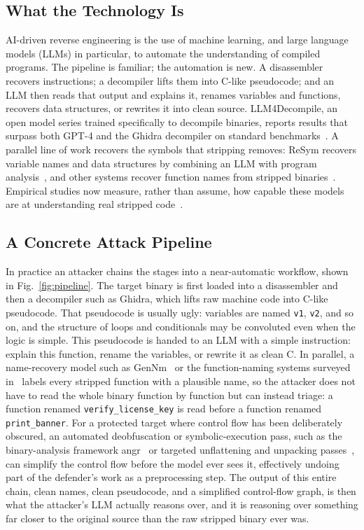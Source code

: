 \documentclass[conference]{IEEEtran}
\begin{document}
\subsection{What the Technology Is}
AI-driven reverse engineering is the use of machine learning, and large language
models (LLMs) in particular, to automate the understanding of compiled programs.
The pipeline is familiar; the automation is new. A disassembler recovers
instructions; a decompiler lifts them into C-like pseudocode; and an LLM then reads
that output and explains it, renames variables and functions, recovers data
structures, or rewrites it into clean source. LLM4Decompile, an open model series
trained specifically to decompile binaries, reports results that surpass both GPT-4
and the Ghidra decompiler on standard benchmarks~\cite{llm4decompile}. A parallel
line of work recovers the symbols that stripping removes: ReSym recovers variable
names and data structures by combining an LLM with program analysis~\cite{resym},
and other systems recover function names from stripped
binaries~\cite{gennm,funcname}. Empirical studies now measure, rather than assume,
how capable these models are at understanding real stripped
code~\cite{howfar,empirical}.

\subsection{A Concrete Attack Pipeline}
In practice an attacker chains the stages into a near-automatic workflow, shown in
Fig.~\ref{fig:pipeline}. The target binary is first loaded into a disassembler and
then a decompiler such as Ghidra, which lifts raw machine code into C-like
pseudocode. That pseudocode is usually ugly: variables are named \texttt{v1},
\texttt{v2}, and so on, and the structure of loops and conditionals may be
convoluted even when the logic is simple. This pseudocode is handed to an LLM with
a simple instruction: explain this function, rename the variables, or rewrite it as
clean C. In parallel, a name-recovery model such as GenNm~\cite{gennm} or the
function-naming systems surveyed in~\cite{funcname} labels every stripped function
with a plausible name, so the attacker does not have to read the whole binary
function by function but can instead triage: a function renamed
\texttt{verify\_license\_key} is read before a function renamed
\texttt{print\_banner}. For a protected target where control flow has been
deliberately obscured, an automated deobfuscation or symbolic-execution pass, such
as the binary-analysis framework angr~\cite{angr} or targeted unflattening and
unpacking passes~\cite{udupa,rolles}, can simplify the control flow before the
model ever sees it, effectively undoing part of the defender's work as a
preprocessing step. The output of this entire chain, clean names, clean pseudocode,
and a simplified control-flow graph, is then what the attacker's LLM actually
reasons over, and it is reasoning over something far closer to the original source
than the raw stripped binary ever was.
\end{document}

